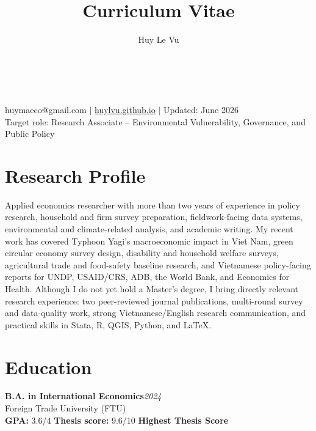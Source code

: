 \documentclass[10pt]{article}
\makeatletter
\newcommand{\cvcolor}{\color{DodgerBlue4}}
\renewcommand{\maketitle}{
\begin{center}
{\Huge\theauthor}\\
\vspace{0.12em}
{\Large \cvcolor{Curriculum Vitae}}\\
{\color{Gray}huymaeco@gmail.com $|$ \href{https://huylvu.github.io}{huylvu.github.io} $|$ Updated: June 2026}\\
{\color{Gray}Target role: Research Associate -- Environmental Vulnerability, Governance, and Public Policy}
\end{center}
}
\makeatother
\begin{document}
\title{Curriculum Vitae}
\author{Huy Le Vu}
\maketitle

\section{Research Profile}
Applied economics researcher with more than two years of experience in policy research, household and firm survey preparation, fieldwork-facing data systems, environmental and climate-related analysis, and academic writing. My recent work has covered Typhoon Yagi's macroeconomic impact in Viet Nam, green circular economy survey design, disability and household welfare surveys, agricultural trade and food-safety baseline research, and Vietnamese policy-facing reports for UNDP, USAID/CRS, ADB, the World Bank, and Economics for Health. Although I do not yet hold a Master's degree, I bring directly relevant research experience: two peer-reviewed journal publications, multi-round survey and data-quality work, strong Vietnamese/English research communication, and practical skills in Stata, R, QGIS, Python, and \LaTeX.

\section{Education}
\textbf{B.A. in International Economics}\hfill\emph{2024}\\
Foreign Trade University (FTU)\\
\textbf{GPA:} 3.6/4 \quad \textbf{Thesis score:} 9.6/10 \quad \textbf{Highest Thesis Score}
\end{document}
